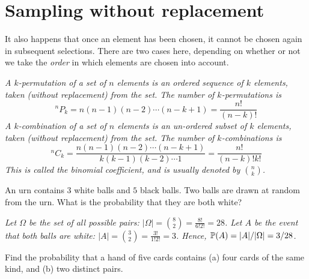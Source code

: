 \newpage

\section{Sampling without replacement}
It also happens that once an element has been chosen, it cannot be chosen again in subsequent selections. There are two cases here, depending on whether or not we take the \emph{order} in which elements are chosen into account.

\begin{definition}
\ben
\it A \emph{$k$-permutation} of a set of $n$ elements is an ordered sequence of $k$ elements, taken (without replacement) from the set. The number of $k$-permutations is
\[
^nP_k = n(n-1)(n-2)\cdots(n-k+1) = \frac{n!}{(n-k)!}
\]
\it A \emph{$k$-combination} of a set of $n$ elements is an un-ordered subset of $k$ elements, taken (without replacement) from the set. The number of $k$-combinations is
\[
^nC_k = \frac{n(n-1)(n-2)\cdots(n-k+1)}{k(k-1)(k-2)\cdots 1} = \frac{n!}{(n-k)!k!}
\]
This is called the \emph{binomial coefficient}, and is usually denoted by $\binom{n}{k}$.
\een
\end{definition}

\begin{example}
An urn contains $3$ white balls and $5$ black balls. Two balls are drawn at random from the urn. What is the probability that they are both white?
\end{example}

\begin{solution}
\bit
\it Let $\Omega$ be the set of all possible pairs: $|\Omega|	= \displaystyle\binom{8}{2} = \frac{8!}{6!2!} = 28$. 
\it Let $A$ be the event that both balls are white: $|A|  = \displaystyle\binom{3}{2} = \frac{3!}{1!2!} = 3$.
\eit
Hence, $\mathbb{P}(A) = |A|/|\Omega| = 3/28$.
\end{solution}


\begin{example}
Find the probability that a hand of five cards contains (a) four cards of the same kind, and (b) two distinct pairs.
\end{example}

